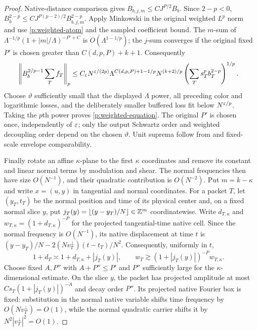 \begin{proof}
Native-distance comparison gives
$B_{b,j,m}\leq CJ^{P/2}B_b$.  Since $2-p<0$,
$B_b^{2-p}\leq CJ^{P(p-2)/2}B_{b,j,m}^{2-p}$.  Apply
Minkowski in the original weighted $L^p$ norm and use
\eqref{p:weighted-atom} and the sampled coefficient bound.  The
$m$-sum of $\Lambda^{-1/p}(1+|m|/\Lambda)^{-P'+C}$ is
$O(\Lambda^{1-1/p})$; the $j$-sum converges if the original fixed
$P'$ is chosen greater than $C(d,p,P)+k+1$.  Consequently
\[
 \left\|B_b^{2/p-1}\sum_Tf_T\right\|_p
 \leq C_\varepsilon N^{\varepsilon/(2p)}
 \Lambda^{C(d,p,P)+1-1/p}N^{(k+2)/p}
 \left(\sum_Ts_T^pb_T^{2-p}\right)^{1/p}.
\]
Choose $\vartheta$ sufficiently small that the displayed $\Lambda$
power, all preceding color and logarithmic losses, and the deliberately
smaller buffered loss fit below $N^{\varepsilon/p}$.  Taking the $p$th power
proves \eqref{p:weighted-equation}.  The original $P'$ is chosen once,
independently of $\varepsilon$; only the output Schwartz order and weighted
decoupling order depend on the chosen $\vartheta$.  Unit suprema follow
from  and fixed-scale envelope comparability.

Finally rotate an affine $\kappa$-plane to the first $\kappa$ coordinates
and remove its constant and linear normal terms by modulation and shear.
The normal frequencies then have size $O(N^{-1})$, and their quadratic
contribution is $O(N^{-2})$.  Put $m=k-\kappa$ and write $x=(u,y)$ in
tangential and normal coordinates.  For a packet $T$, let $(y_T,t_T)$ be
the normal position and time of its physical center and, on a fixed normal
slice $y$, put $j_T(y)=\lfloor(y-y_T)/N\rfloor\in\mathbb Z^m$ coordinatewise.
Write $d_{T,\kappa}$ and $w_{T,\kappa}=(1+d_{T,\kappa})^{-P}$ for the
projected tangential-time native cell.  Since the normal frequency is
$O(N^{-1})$, its native displacement at time $t$ is
$(y-y_T)/N-2(Nv_T^\perp)(t-t_T)/N^2$.  Consequently, uniformly in $t$,
\[
 1+d_T\asymp1+d_{T,\kappa}+|j_T(y)|,
 \qquad w_T\gtrsim(1+|j_T(y)|)^{-P}w_{T,\kappa}.
\]
Choose fixed $A,P''$ with $A+P''\le P'$ and $P''$ sufficiently large for
the $\kappa$-dimensional estimate.  On the slice $y$, the packet has
projected amplitude at most $Cs_T(1+|j_T(y)|)^{-A}$ and decay order
$P''$.  Its projected native Fourier box is fixed: substitution in the
normal native variable shifts time frequency by $O(Nv_T^\perp)=O(1)$,
while the normal quadratic carrier shifts it by
$N^2|v_T^\perp|^2=O(1)$.


\end{proof}
